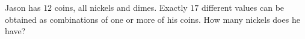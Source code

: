 Jason has $12$ coins, all nickels and dimes. Exactly $17$ different values can be obtained as combinations of one or more of his coins. How many nickels does he have?
